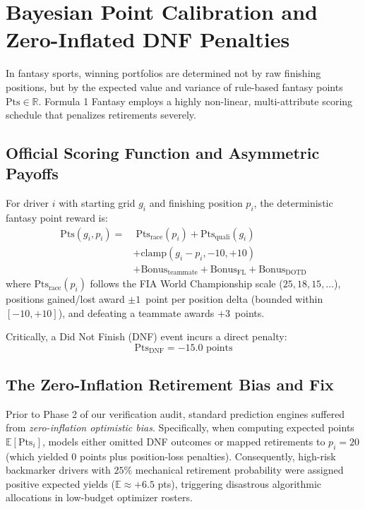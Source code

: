 \section{Bayesian Point Calibration and Zero-Inflated DNF Penalties}
\label{sec:bayesian_point_calibration}

In fantasy sports, winning portfolios are determined not by raw finishing positions, but by the expected value and variance of rule-based fantasy points $\text{Pts} \in \mathbb{R}$. Formula 1 Fantasy employs a highly non-linear, multi-attribute scoring schedule that penalizes retirements severely.

\subsection{Official Scoring Function and Asymmetric Payoffs}
For driver $i$ with starting grid $g_i$ and finishing position $p_i$, the deterministic fantasy point reward is:
\begin{align}
\text{Pts}(g_i, p_i) = &\; \text{Pts}_{\text{race}}(p_i) + \text{Pts}_{\text{quali}}(g_i) \nonumber \\
&+ \text{clamp}\left( g_i - p_i, -10, +10 \right) \nonumber \\
&+ \text{Bonus}_{\text{teammate}} + \text{Bonus}_{\text{FL}} + \text{Bonus}_{\text{DOTD}}
\label{eq:scoring_formula}
\end{align}
where $\text{Pts}_{\text{race}}(p_i)$ follows the FIA World Championship scale ($25, 18, 15, \dots$), positions gained/lost award $\pm 1$~point per position delta (bounded within $[-10, +10]$), and defeating a teammate awards $+3$~points.

Critically, a Did Not Finish (DNF) event incurs a direct penalty:
\begin{equation}
\text{Pts}_{\text{DNF}} = -15.0 \text{ points}
\label{eq:dnf_penalty}
\end{equation}

\subsection{The Zero-Inflation Retirement Bias and Fix}
Prior to Phase 2 of our verification audit, standard prediction engines suffered from \textit{zero-inflation optimistic bias}. Specifically, when computing expected points $\mathbb{E}[\text{Pts}_i]$, models either omitted DNF outcomes or mapped retirements to $p_i = 20$ (which yielded $0$ points plus position-loss penalties). Consequently, high-risk backmarker drivers with $25\%$ mechanical retirement probability were assigned positive expected yields ($\mathbb{E} \approx +6.5$ pts), triggering disastrous algorithmic allocations in low-budget optimizer rosters.


